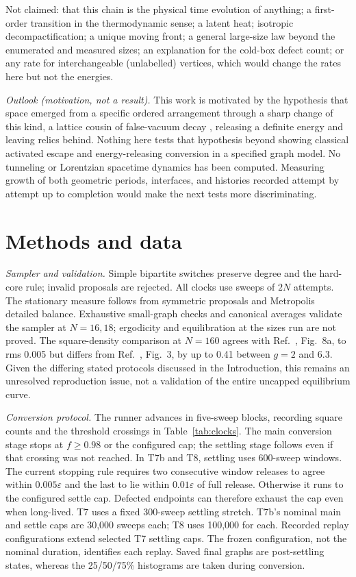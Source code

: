 \documentclass[aps,pre,10pt,twocolumn,superscriptaddress,nofootinbib]{revtex4-2}
\begin{document}
Not claimed: that this chain is the physical time evolution of anything; a first-order transition in the
thermodynamic sense; a latent heat; isotropic decompactification; a unique moving front; a general
large-size law beyond the enumerated and measured sizes; an explanation for the cold-box defect count; or any rate for interchangeable (unlabelled)
vertices, which would change the rates here but not the energies.

\emph{Outlook (motivation, not a result).} This work is motivated by the hypothesis that space emerged from a
specific ordered arrangement through a sharp change of this kind, a lattice cousin of false-vacuum decay
\cite{C77}, releasing a definite energy and leaving relics behind. Nothing here tests that hypothesis beyond
showing classical activated escape and energy-releasing conversion in a specified graph model.
No tunneling or Lorentzian spacetime dynamics has been computed. Measuring growth of both geometric periods,
interfaces, and histories recorded attempt by attempt up to completion would make the next tests
more discriminating.

\section*{Methods and data}

\emph{Sampler and validation.} Simple bipartite switches preserve degree and the hard-core rule;
invalid proposals are rejected. All clocks use sweeps of $2N$ attempts.
The stationary measure follows from symmetric proposals and Metropolis detailed balance.
Exhaustive small-graph checks and canonical averages validate the sampler at $N=16,18$;
ergodicity and equilibration at the sizes run are not proved. The square-density comparison at
$N=160$ agrees with Ref.~\cite{KTB19}, Fig.~8a, to rms 0.005 but differs from Ref.~\cite{T25}, Fig.~3,
by up to 0.41 between $g=2$ and 6.3. Given the differing stated protocols discussed in the Introduction,
this remains an unresolved reproduction issue, not a validation of the entire uncapped equilibrium curve.

\emph{Conversion protocol.} The runner advances in five-sweep blocks, recording square counts and
the threshold crossings in Table~\ref{tab:clocks}. The main conversion stage stops at $f\ge0.98$
or the configured cap; the settling stage follows even if that crossing was not reached.
In T7b and T8, settling uses 600-sweep windows. The current stopping rule requires two consecutive
window releases to agree within $0.005\varepsilon$ and the last to lie within $0.01\varepsilon$
of full release. Otherwise it runs to the configured settle cap. Defected endpoints can therefore
exhaust the cap even when long-lived. T7 uses a fixed 300-sweep settling stretch.
T7b's nominal main and settle caps are 30,000 sweeps each; T8 uses 100,000 for each.
Recorded replay configurations extend selected T7 settling caps. The frozen configuration, not the
nominal duration, identifies each replay. Saved final graphs are post-settling states, whereas the
25/50/75\% histograms are taken during conversion.
\end{document}
